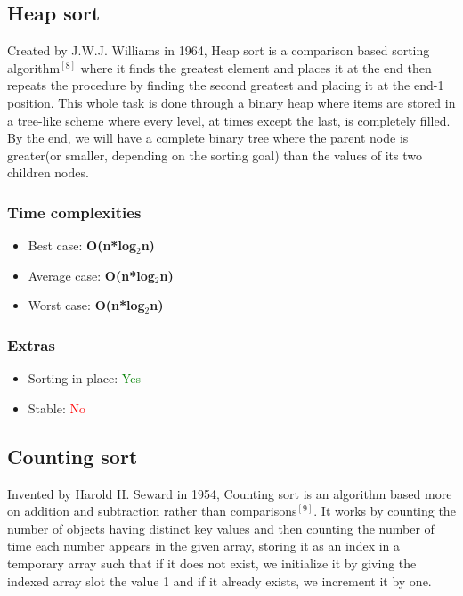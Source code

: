 \documentclass{article}
\begin{document}
\begin{multicols}{2}
\bigbreak \bigbreak \bigbreak \bigbreak \bigbreak \bigbreak \bigbreak \bigbreak \bigbreak \bigbreak \bigbreak \bigbreak \bigbreak \bigbreak \bigbreak \bigbreak \bigbreak \bigbreak \bigbreak \bigbreak


\subsection{Heap sort}
Created by J.W.J. Williams in 1964, Heap sort is a comparison based sorting algorithm$^{[8]}$ where it  finds the greatest element and places it at the end then repeats the procedure by finding the second greatest and placing it at the end-1 position. This whole task is done through a binary heap where items are stored in a tree-like scheme where every level, at times except the last, is completely filled. By the end, we will have a complete binary tree where the parent node is greater(or smaller, depending on the sorting goal) than the values of its two children nodes.
\subsubsection{Time complexities}
\begin{itemize}
    \item Best case: \textbf{O(n*log$_2$n)}
    \item Average case: \textbf{O(n*log$_2$n)}
    \item Worst case: \textbf{O(n*log$_2$n)}
\end{itemize}

\subsubsection{Extras}
\begin{itemize}
    \item Sorting in place: \textcolor{green}{Yes}
    \item Stable: \textcolor{red}{No}
\end{itemize}

\bigbreak \bigbreak \bigbreak \bigbreak \bigbreak \bigbreak \bigbreak \bigbreak \bigbreak \bigbreak \bigbreak \bigbreak \bigbreak \bigbreak \bigbreak \bigbreak \bigbreak \bigbreak \bigbreak \bigbreak



\subsection{Counting sort}
Invented by Harold H. Seward in 1954, Counting sort is an algorithm based more on addition and subtraction rather than comparisons$^{[9]}$. It works by counting the number of objects having distinct key values and then counting the number of time each number appears in the given array, storing it as an index in a temporary array such that if it does not exist, we initialize it by giving the indexed array slot the value 1 and if it already exists, we increment it by one.

\end{multicols}
\end{document}
